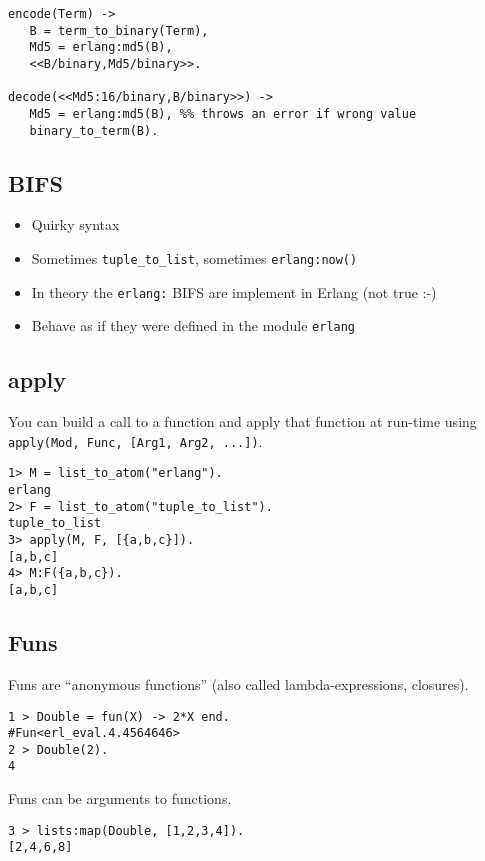 \documentclass[12pt]{article}
\begin{document}
\begin{verbatim}
encode(Term) ->
   B = term_to_binary(Term),
   Md5 = erlang:md5(B),
   <<B/binary,Md5/binary>>.

decode(<<Md5:16/binary,B/binary>>) ->
   Md5 = erlang:md5(B), %% throws an error if wrong value
   binary_to_term(B).
\end{verbatim}

\subsection{BIFS}

\begin{itemize}
\item Quirky syntax
\item Sometimes \verb+tuple_to_list+, sometimes \verb+erlang:now()+
\item In theory the \verb+erlang:+ BIFS are implement in Erlang (not true :-)

\item Behave as if they were defined in the module \verb+erlang+
\end{itemize}

\subsection{apply}

You can build a call to a function and apply that function at run-time
using \verb+apply(Mod, Func, [Arg1, Arg2, ...])+.

\begin{verbatim}
1> M = list_to_atom("erlang").       
erlang
2> F = list_to_atom("tuple_to_list").
tuple_to_list
3> apply(M, F, [{a,b,c}]).           
[a,b,c]
4> M:F({a,b,c}).
[a,b,c]
\end{verbatim}

\subsection{Funs}

Funs are ``anonymous functions'' (also called lambda-expressions, closures).

\begin{verbatim}
1 > Double = fun(X) -> 2*X end.
#Fun<erl_eval.4.4564646>
2 > Double(2).
4
\end{verbatim}

Funs can be arguments to functions.

\begin{verbatim}
3 > lists:map(Double, [1,2,3,4]).
[2,4,6,8]
\end{verbatim}
\end{document}
